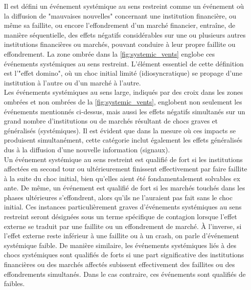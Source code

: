 Il est défini un événement systémique au sens restreint comme un événement où la diffusion de "mauvaises nouvelles" concernant une institution financière, ou même sa faillite, ou encore l’effondrement d’un marché financier, entraîne, de manière séquentielle, des effets négatifs considérables sur une ou plusieurs autres institutions financières ou marchés, pouvant conduire à leur propre faillite ou effondrement. La zone ombrée dans la \autoref{fig:systemic_vents} englobe ces événements systémiques au sens restreint. L’élément essentiel de cette définition est l’"effet domino", où un choc initial limité (idiosyncratique) se propage d’une institution à l’autre ou d’un marché à l’autre.\\

Les événements systémiques au sens large, indiqués par des croix dans les zones ombrées et non ombrées de la \autoref{fig:systemic_vents}, englobent non seulement les événements mentionnés ci-dessus, mais aussi les effets négatifs simultanés sur un grand nombre d’institutions ou de marchés résultant de chocs graves et généralisés (systémiques). Il est évident que dans la mesure où ces impacts se produisent simultanément, cette catégorie inclut également les effets généralisés dus à la diffusion d’une nouvelle information (signaux).\\

Un événement systémique au sens restreint est qualifié de fort si les institutions affectées en second tour ou ultérieurement finissent effectivement par faire faillite à la suite du choc initial, bien qu’elles aient été fondamentalement solvables ex ante. De même, un événement est qualifié de fort si les marchés touchés dans les phases ultérieures s’effondrent, alors qu’ils ne l’auraient pas fait sans le choc initial. Ces instances particulièrement graves d’événements systémiques au sens restreint seront désignées sous un terme spécifique de contagion lorsque l'effet externe se traduit par une faillite ou un effondrement de marché. À l’inverse, si l’effet externe reste inférieur à une faillite ou à un crash, on parle d’événement systémique faible. De manière similaire, les événements systémiques liés à des chocs systémiques sont qualifiés de forts si une part significative des institutions financières ou des marchés affectés subissent effectivement des faillites ou des effondrements simultanés. Dans le cas contraire, ces événements sont qualifiés de faibles.


